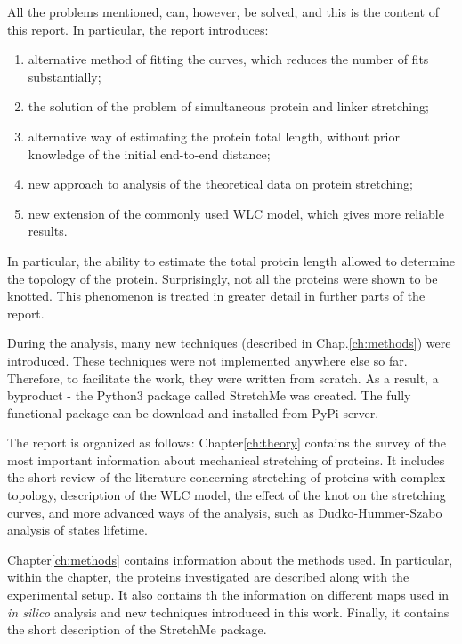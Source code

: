 All the problems mentioned, can, however, be solved, and this is the content of this report.
In particular, the report introduces:
\begin{enumerate}
    \item alternative method of fitting the curves, which reduces the number of fits substantially;
    \item the solution of the problem of simultaneous protein and linker stretching;
    \item alternative way of estimating the protein total length, without prior knowledge of the initial end-to-end distance;
    \item new approach to analysis of the theoretical data on protein stretching;
    \item new extension of the commonly used WLC model, which gives more reliable results.
\end{enumerate}

In particular, the ability to estimate the total protein length allowed to determine the topology of the protein.
Surprisingly, not all the proteins were shown to be knotted.
This phenomenon is treated in greater detail in further parts of the report.

During the analysis, many new techniques (described in Chap.\ref{ch:methods}) were introduced.
These techniques were not implemented anywhere else so far.
Therefore, to facilitate the work, they were written from scratch.
As a result, a byproduct - the Python3 package called StretchMe was created.
The fully functional package can be download and installed from PyPi server.

The report is organized as follows:
Chapter\ref{ch:theory} contains the survey of the most important information about mechanical stretching of proteins.
It includes the short review of the literature concerning stretching of proteins with complex topology, description of the WLC model, the effect of the knot on the stretching curves, and more advanced ways of the analysis, such as Dudko-Hummer-Szabo analysis of states lifetime.

Chapter\ref{ch:methods} contains information about the methods used.
In particular, within the chapter, the proteins investigated are described along with the experimental setup.
It also contains th the information on different maps used in \textit{in silico} analysis and new techniques introduced in this work.
Finally, it contains the short description of the StretchMe package.


